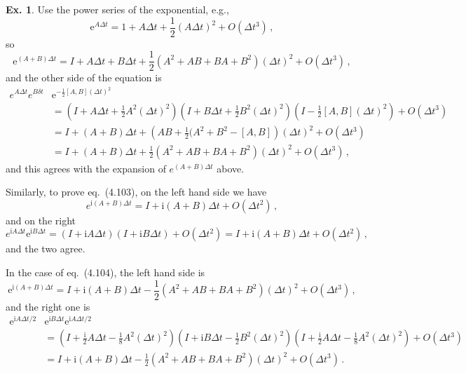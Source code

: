 \documentclass[a4paper,12pt]{article}
\def\e{\mathrm{e}}
\def\imagi{\mathrm{i}}
\theoremstyle{definition}
\newtheorem{exercise}{Ex.}[section]
\begin{document}
\begin{exercise}
 Use the power series of the exponential, e.g.,
 \[
  \e^{A\Delta t} = 1 + A\Delta t + \frac{1}{2}(A\Delta t)^2 + O(\Delta t^3)\,,
 \]
 so
 \[
  \e^{(A+B)\Delta t} = I + A\Delta t + B \Delta t + \frac{1}{2}(A^2 + AB + BA + B^2)(\Delta t)^2 + O(\Delta t^3)\,,
 \]
 and the other side of the equation is
 \[
  \begin{aligned}
   e^{A\Delta t}e^{B\delta t}&\e^{-\frac{1}{2}[A,B](\Delta t)^2} \\
   &= (I+A\Delta t+\frac{1}{2}A^2(\Delta t)^2)(I+B\Delta t+\frac{1}{2}B^2(\Delta t)^2)(I-\frac{1}{2}[A,B](\Delta t)^2) + O(\Delta t^3)\\
   &=I+(A+B)\Delta t + \left(AB + \frac{1}{2}(A^2+B^2-[A,B] \right)(\Delta t)^2 + O(\Delta t^3)\\
   &=I+(A+B)\Delta t + \frac{1}{2}\left( A^2 + AB+BA+B^2\right)(\Delta t)^2 + O(\Delta t^3)\,,
  \end{aligned}
 \]
 and this agrees with the expansion of $e^{(A+B)\Delta t}$ above.

 Similarly, to prove eq.\ (4.103), on the left hand side we have
 \[
  e^{\imagi(A+B)\Delta t} = I + \imagi(A+B)\Delta t+O(\Delta t^2)\,,
 \]
 and on the right
 \[
  e^{\imagi A\Delta t}\e^{\imagi B \Delta t} = (I+\imagi A\Delta t)(I+\imagi B\Delta t)+O(\Delta t^2) = I + \imagi (A+B)\Delta t+O(\Delta t^2)\,,
 \]
 and the two agree.
 
 In the case of eq.\ (4.104), the left hand side is
 \[
  \e^{\imagi (A+B)\Delta t}=I + \imagi(A+B)\Delta t - \frac{1}{2}(A^2 + AB + BA+B^2)(\Delta t)^2 + O(\Delta t^3)\,,
 \]
 and the right one is
 \[
  \begin{aligned}
   \e^{\imagi A\Delta t/2}&\e^{\imagi B\Delta t}\e^{\imagi A\Delta t/2}\\
   &=(I+\frac{\imagi}{2}A\Delta t-\frac{1}{8}A^2 (\Delta t)^2)(I+\imagi B\Delta t-\frac{1}{2}B^2(\Delta t)^2)(I+\frac{\imagi}{2}A\Delta t-\frac{1}{8}A^2 (\Delta t)^2)+O(\Delta t^3)\\
   &= I + \imagi(A+B)\Delta t -\frac{1}{2}\left( A^2 + AB +BA+ B^2 \right) (\Delta t)^2 + O(\Delta t^3)\,.
 \end{aligned}
 \]
\end{exercise}
\end{document}
